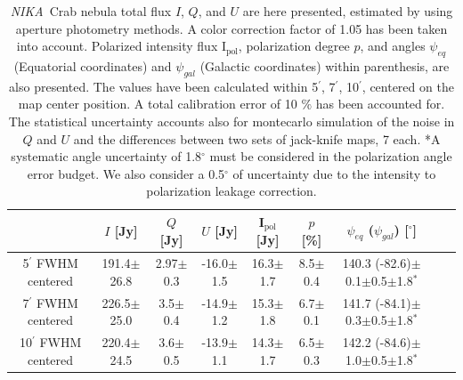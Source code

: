 \documentclass[twocolumn,traditabstract]{aa}
\def\NIKA{\textit{NIKA}}
\begin{document}
\begin{table}[h!]
  \centering
      \begin{tabular}{ccccccccc}
      \hline
      \hline
       & \small $I$ [Jy] & \small $Q$ [Jy] & \small $U$ [Jy] & \small I$_\textrm{pol}$ [Jy] & \small $p$ [\%] & \small $\psi_{eq}$ ($\psi_{gal}$) [$^\circ$] \\
      \hline

\small 5$^{\prime}$ FWHM centered & \small 191.4$\pm$26.8 & \small 2.97$\pm$0.3 & \small -16.0$\pm$1.5 & \small 16.3$\pm$1.7 & \small 8.5$\pm$0.4 & \small 140.3 (-82.6)$\pm$0.1$\pm$0.5$\pm$1.8$^*$  \\ 
\small 7$^{\prime}$ FWHM centered & \small 226.5$\pm$25.0 & \small 3.5$\pm$0.4 & \small -14.9$\pm$1.2 & \small 15.3$\pm$1.8 & \small 6.7$\pm$0.1 & \small 141.7 (-84.1)$\pm$0.3$\pm$0.5$\pm$1.8$^*$ \\ 
\small 10$^{\prime}$ FWHM centered & \small 220.4$\pm$24.5 & \small 3.6$\pm$0.5 & \small -13.9$\pm$1.1 & \small 14.3$\pm$1.7 & \small 6.5$\pm$0.3 & \small 142.2 (-84.6)$\pm$1.0$\pm$0.5$\pm$1.8$^*$ \\ 
\hline            
    \hline   
    \end{tabular}
   \caption{ 
   \NIKA\ Crab nebula total flux $I$, $Q$, and $U$ are here presented, estimated by using aperture photometry methods. A color correction factor of 1.05 has been taken into account. Polarized intensity flux I$_\textrm{pol}$, polarization degree $p$, and angles $\psi_{eq}$ (Equatorial coordinates) and $\psi_{gal}$ (Galactic coordinates) within parenthesis, are also presented. The values have been calculated within 5$^{\prime}$, 7$^{\prime}$, 10$^{\prime}$, centered on the map center position.
   A total calibration error of 10 $\%$ has been accounted for. The statistical uncertainty accounts also for montecarlo simulation of the noise in $Q$ and $U$ and the differences between two sets of jack-knife maps, 7 each.
 *A systematic angle uncertainty of 1.8$^{\circ}$ must be considered in the polarization angle error budget. We also consider a 0.5$^{\circ}$ of uncertainty due to the intensity to polarization leakage correction.    
    }
    \label{tab:crab_results}
 \end{table}
\end{document}
